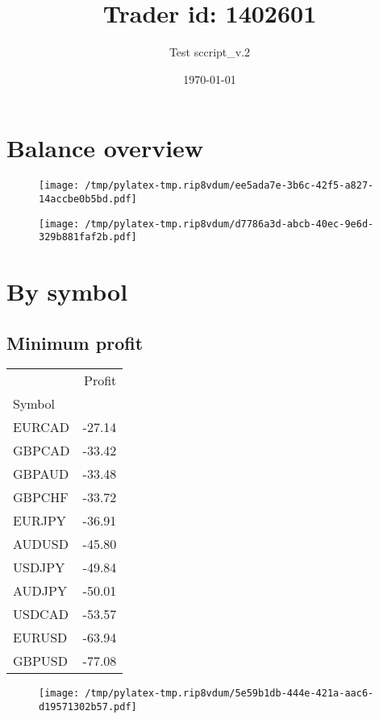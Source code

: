 \documentclass{article}%
\title{Trader id: 1402601}%
\author{Test sccript\_v.2}%
\date{\today}%
\begin{document}
%
\normalsize%
\maketitle%
\section{Balance overview}%
\label{sec:Balanceoverview}%


\begin{figure}[htbp]%
\centering%
\texttt{[image: /tmp/pylatex-tmp.rip8vdum/ee5ada7e-3b6c-42f5-a827-14accbe0b5bd.pdf]}%
\end{figure}

%


\begin{figure}[htbp]%
\centering%
\texttt{[image: /tmp/pylatex-tmp.rip8vdum/d7786a3d-abcb-40ec-9e6d-329b881faf2b.pdf]}%
\end{figure}

%
\section{By symbol}%
\label{sec:Bysymbol}%
\subsection{Minimum profit }%
\label{subsec:Minimumprofit}%
\begin{tabular}{lr}
\toprule
{} &  Profit \\
Symbol &         \\
\midrule
EURCAD &  -27.14 \\
GBPCAD &  -33.42 \\
GBPAUD &  -33.48 \\
GBPCHF &  -33.72 \\
EURJPY &  -36.91 \\
AUDUSD &  -45.80 \\
USDJPY &  -49.84 \\
AUDJPY &  -50.01 \\
USDCAD &  -53.57 \\
EURUSD &  -63.94 \\
GBPUSD &  -77.08 \\
\bottomrule
\end{tabular}
%


\begin{figure}[htbp]%
\centering%
\texttt{[image: /tmp/pylatex-tmp.rip8vdum/5e59b1db-444e-421a-aac6-d19571302b57.pdf]}%
\end{figure}
\end{document}
